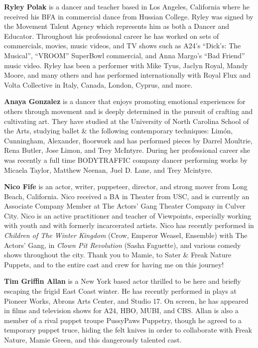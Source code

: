 \documentclass[10pt,letterpaper,landscape]{article}
\begin{document}
{\textbf{Ryley Polak} is a dancer and teacher based in Los Angeles, California where he received his BFA in commercial dance from Hussian College. Ryley was signed by the Movement Talent Agency which represents him as both a Dancer and Educator. Throughout his professional career he has worked on sets of commercials, movies, music videos, and TV shows such as A24's ``Dick's: The Musical'', ``VROOM'' SuperBowl commercial, and Anna Margo's ``Bad Friend'' music video. Ryley has been a performer with Mike Tyus, Jaclyn Royal, Mandy Moore, and many others and has performed internationally with Royal Flux and Volta Collective in Italy, Canada, London, Cyprus, and more.

\textbf{Anaya Gonzalez} is a dancer that enjoys promoting emotional experiences for others through movement and is deeply determined in the pursuit of crafting and cultivating art. They have studied at the University of North Carolina School of the Arts, studying ballet \& the following contemporary techniques: Limón, Cunningham, Alexander, floorwork and has performed pieces by Darrel Moultrie, Rena Butler, Jose Limon, and Trey McIntyre. During her professional career she was recently a full time BODYTRAFFIC company dancer performing works by Micaela Taylor, Matthew Neenan, Juel D. Lane, and Trey Mcintyre.

\textbf{Nico Fife} is an actor, writer, puppeteer, director, and strong mover from Long Beach, California. Nico received a BA in Theater from USC, and is currently an Associate Company Member at The Actors' Gang Theater Company in Culver City. Nico is an active practitioner and teacher of Viewpoints, especially working with youth and with formerly incarcerated artists. Nico has recently performed in \textit{Children of The Winter Kingdom} (Crow, Emperor Weasel, Ensemble) with The Actors' Gang, in \textit{Clown Pit Revolution} (Sasha Faguette), and various comedy shows throughout the city. Thank you to Mamie, to Sater \& Freak Nature Puppets, and to the entire cast and crew for having me on this journey!

\textbf{Tim Griffin Allan} is a New York based actor thrilled to be here and briefly escaping the frigid East Coast winter. He has recently performed in plays at Pioneer Works, Abrons Arts Center, and Studio 17. On screen, he has appeared in films and television shows for A24, HBO, MUBI, and CBS. Allan is also a member of a rival puppet troupe PussyPaws Puppetry, though he agreed to a temporary puppet truce, hiding the felt knives in order to collaborate with Freak Nature, Mamie Green, and this dangerously talented cast.

}
\end{document}
